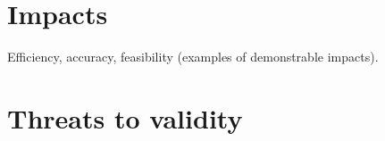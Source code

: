 
\section{Impacts}
Efficiency, accuracy, feasibility (examples of demonstrable impacts).
\section{Threats to validity}